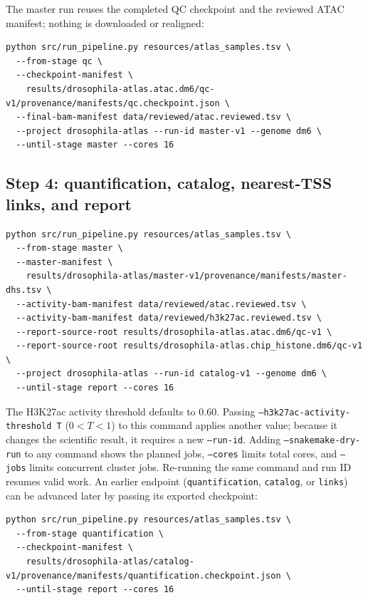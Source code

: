 \documentclass[11pt]{article}
\newcommand{\stage}[1]{\texttt{#1}}
\begin{document}
The master run reuses the completed QC checkpoint and the reviewed ATAC
manifest; nothing is downloaded or realigned:

\begin{lstlisting}
python src/run_pipeline.py resources/atlas_samples.tsv \
  --from-stage qc \
  --checkpoint-manifest \
    results/drosophila-atlas.atac.dm6/qc-v1/provenance/manifests/qc.checkpoint.json \
  --final-bam-manifest data/reviewed/atac.reviewed.tsv \
  --project drosophila-atlas --run-id master-v1 --genome dm6 \
  --until-stage master --cores 16
\end{lstlisting}

\subsection{Step 4: quantification, catalog, nearest-TSS links, and report}

\begin{lstlisting}
python src/run_pipeline.py resources/atlas_samples.tsv \
  --from-stage master \
  --master-manifest \
    results/drosophila-atlas/master-v1/provenance/manifests/master-dhs.tsv \
  --activity-bam-manifest data/reviewed/atac.reviewed.tsv \
  --activity-bam-manifest data/reviewed/h3k27ac.reviewed.tsv \
  --report-source-root results/drosophila-atlas.atac.dm6/qc-v1 \
  --report-source-root results/drosophila-atlas.chip_histone.dm6/qc-v1 \
  --project drosophila-atlas --run-id catalog-v1 --genome dm6 \
  --until-stage report --cores 16
\end{lstlisting}

The H3K27ac activity threshold defaults to 0.60.  Passing
\texttt{--h3k27ac-activity-threshold T} (\(0<T<1\)) to this command applies
another value; because it changes the scientific result, it requires a new
\texttt{--run-id}.  Adding \texttt{--snakemake-dry-run} to any command shows
the planned jobs, \texttt{--cores} limits total cores, and \texttt{--jobs}
limits concurrent cluster jobs.  Re-running the same command and run ID resumes
valid work.  An earlier endpoint (\stage{quantification}, \stage{catalog}, or
\stage{links}) can be advanced later by passing its exported checkpoint:

\begin{lstlisting}[basicstyle=\ttfamily\footnotesize]
python src/run_pipeline.py resources/atlas_samples.tsv \
  --from-stage quantification \
  --checkpoint-manifest \
    results/drosophila-atlas/catalog-v1/provenance/manifests/quantification.checkpoint.json \
  --until-stage report --cores 16
\end{lstlisting}
\end{document}
